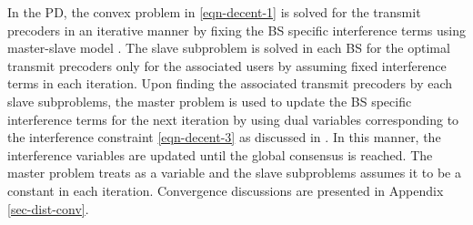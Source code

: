 In the \acl{PD}, the convex problem in \eqref{eqn-decent-1} is solved for the transmit precoders in an iterative manner by fixing the \ac{BS} specific interference terms  using master-slave model \cite{pennanen2011decentralized}. The slave subproblem is solved in each \ac{BS} for the optimal transmit precoders only for the associated users by assuming fixed interference terms  in each  iteration. Upon finding the associated transmit precoders by each slave subproblems, the master problem is used to update the \ac{BS} specific interference terms  for the next iteration by using dual variables corresponding to the interference constraint \eqref{eqn-decent-3} as discussed in \cite{pennanen2011decentralized}. In this manner, the interference variables are updated until the global consensus is reached. The master problem treats  as a variable and the slave subproblems assumes it to be a constant in each iteration. Convergence discussions are presented in Appendix \ref{sec-dist-conv}.
\begin{comment}
The \acl{PD} approach decomposes the problem by fixing the interference variables \me{\zeta_{l,k,n,b} \forall k,b} in order to perform the precoder design independently across each \ac{BS}. Once the optimal precoders are designed at each \ac{BS} with the fixed interference constraints \eqref{eqn-decent-3}, the dual variables corresponding to the interference constraints are exchanged between the cooperating \acp{BS} in \me{\mc{B}} to update the interference variables \me{\zeta_{l,k,n,b}} for the next iteration until convergence. The primal approach is discussed extensively for the min-power problem in \cite{pennanen2011decentralized} and much of the current work follows similar approach. 
\subsubsection*{Convergence}
The convergence of the primal decomposition is similar to that of the centralized problem if the interference variables \me{\zeta_{l,k,n,b}} are allowed to converge to a stationary point. In practice, we can limit the number of exchanges to \me{J_{\max}} after which the \ac{SCA} update is performed until convergence or for \me{I_{\max}} times. The update of \me{\tilde{p}_{l,k,n}, \tilde{q}_{l,k,n}} and \me{\tilde{\beta}_{l,k,n}} can be made in conjunction with the receiver update \me{\mvec{W}{k,n}}. The receiver update can be made by using the precoded pilot transmission from each user as in \cite{komulainen2013effective}. 
\end{comment}
